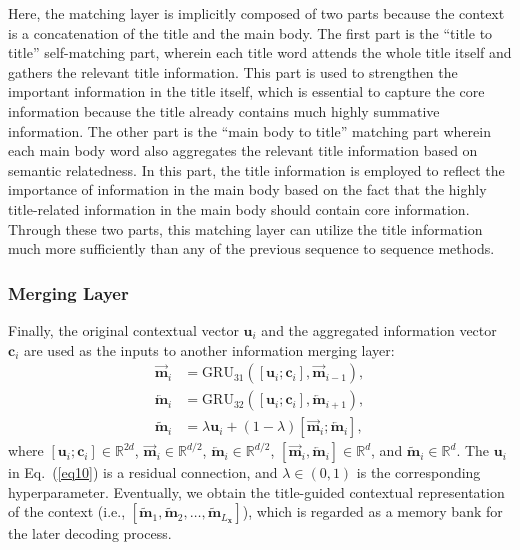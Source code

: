 \documentclass[letterpaper]{article} %
\begin{document}
Here, the matching layer is implicitly composed of two parts because the context is a concatenation of the title and the main body. The first part is the ``title to title'' self-matching part, wherein each title word attends the whole title itself and gathers the relevant title information. This part is used to strengthen the important information in the title itself, which is essential to capture the core information because the title already contains much highly summative information. The other part is the ``main body to title'' matching part wherein each main body word also aggregates the relevant title information based on semantic relatedness. In this part, the title information is employed to reflect the importance of information in the main body based on the fact that the highly title-related information in the main body should contain core information. 
Through these two parts, this matching layer can utilize the title information much more sufficiently than any of the previous sequence to sequence methods.

\subsubsection{Merging Layer}
Finally, the original contextual vector $\mathbf{u}_i$ and the aggregated information vector $\mathbf{c}_i$
are used as the inputs to another information merging layer:
\begin{align}
\overrightarrow{\mathbf{m}}_i &= \text{GRU}_{31}([\mathbf{u}_i; \mathbf{c}_i], \overrightarrow{\mathbf{m}}_{i-1}),\\
\overleftarrow{\mathbf{m}}_i &= \text{GRU}_{32}([\mathbf{u}_i; \mathbf{c}_i], \overleftarrow{\mathbf{m}}_{i+1}),\\
\widetilde{\mathbf{m}}_i &= \lambda \mathbf{u}_i + (1-\lambda) [\overrightarrow{\mathbf{m}}_i; \overleftarrow{\mathbf{m}}_i], \label{eq10}
\end{align}
where $[\mathbf{u}_i; \mathbf{c}_i] \in \mathbb{R}^{2d}$, $\overrightarrow{\mathbf{m}}_i \in \mathbb{R}^{d/2}$, 
$\overleftarrow{\mathbf{m}}_i \in \mathbb{R}^{d/2}$,
$[\overrightarrow{\mathbf{m}}_i, \overleftarrow{\mathbf{m}}_i] \in \mathbb{R}^d$,
and $\widetilde{\mathbf{m}}_i \in \mathbb{R}^d$. The $\mathbf{u}_i$ in Eq.~(\ref{eq10}) is a residual connection, and $\lambda \in (0,1)$ is the corresponding hyperparameter. Eventually, we obtain the title-guided contextual representation of the context (i.e., $[\widetilde{\mathbf{m}}_1, \widetilde{\mathbf{m}}_2,\dots, \widetilde{\mathbf{m}}_{L_{\mathbf{x}}}]$), which is regarded as a memory bank for the later decoding process. 
\end{document}
